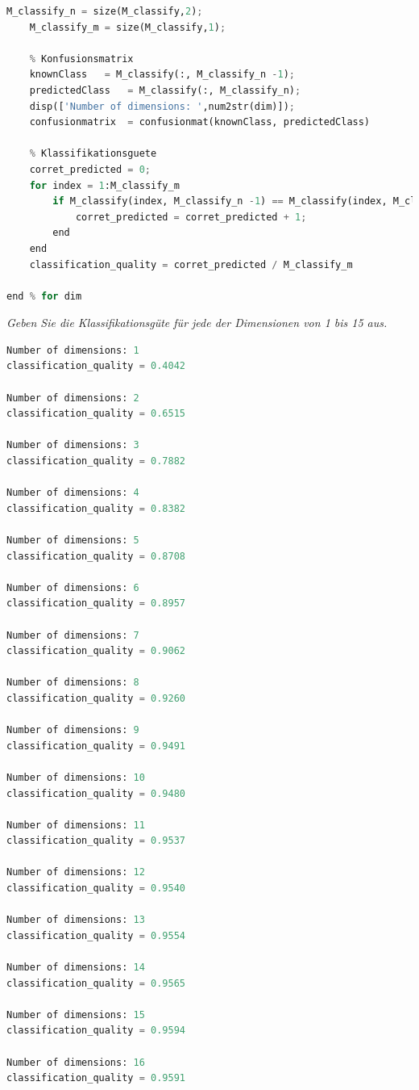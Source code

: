 \documentclass[12pt]{article}
\begin{document}
\begin{lstlisting}[language=Python]
    M_classify_n = size(M_classify,2);
    M_classify_m = size(M_classify,1);

    % Konfusionsmatrix
    knownClass	 = M_classify(:, M_classify_n -1);
    predictedClass	 = M_classify(:, M_classify_n);
    disp(['Number of dimensions: ',num2str(dim)]);
    confusionmatrix	 = confusionmat(knownClass, predictedClass)

    % Klassifikationsguete
    corret_predicted = 0;
    for index = 1:M_classify_m
        if M_classify(index, M_classify_n -1) == M_classify(index, M_classify_n)
            corret_predicted = corret_predicted + 1;
        end
    end
    classification_quality = corret_predicted / M_classify_m
    
end % for dim
\end{lstlisting}
\textit{Geben Sie die Klassifikationsgüte für jede der Dimensionen von 1 bis 15 aus.}\\

\begin{lstlisting}[language=Python]
Number of dimensions: 1
classification_quality = 0.4042

Number of dimensions: 2
classification_quality = 0.6515

Number of dimensions: 3
classification_quality = 0.7882

Number of dimensions: 4
classification_quality = 0.8382

Number of dimensions: 5
classification_quality = 0.8708

Number of dimensions: 6
classification_quality = 0.8957

Number of dimensions: 7
classification_quality = 0.9062

Number of dimensions: 8
classification_quality = 0.9260

Number of dimensions: 9
classification_quality = 0.9491

Number of dimensions: 10
classification_quality = 0.9480

Number of dimensions: 11
classification_quality = 0.9537

Number of dimensions: 12
classification_quality = 0.9540

Number of dimensions: 13
classification_quality = 0.9554

Number of dimensions: 14
classification_quality = 0.9565

Number of dimensions: 15
classification_quality = 0.9594

Number of dimensions: 16
classification_quality = 0.9591
\end{lstlisting}
\end{document}
